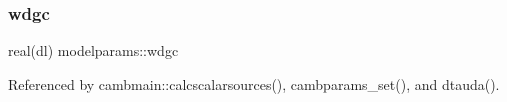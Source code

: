 \mbox{\label{namespacemodelparams_ad94fb2bc6179da9e6382c136f6c94bfe}} 
\subsubsection{\texorpdfstring{wdgc}{wdgc}}
{\footnotesize\ttfamily real(dl) modelparams\+::wdgc}



Referenced by cambmain\+::calcscalarsources(), cambparams\+\_\+set(), and dtauda().

